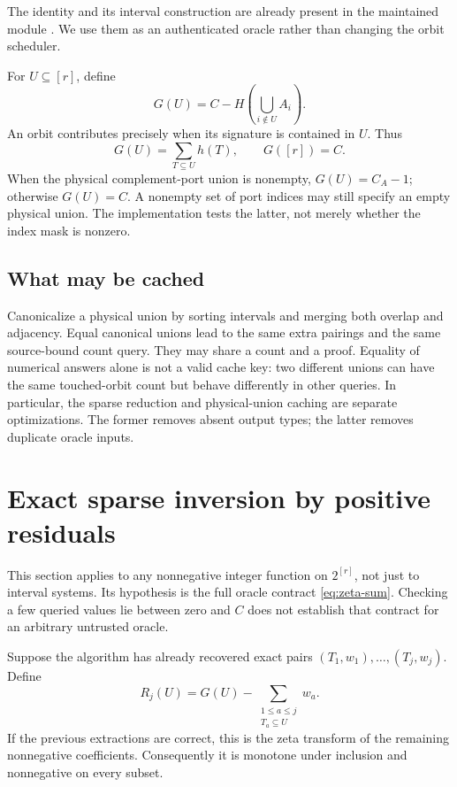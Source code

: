 \documentclass[11pt]{article}
\theoremstyle{definition}
\begin{document}
The identity and its interval construction are already present in the
maintained module \cite{repo-incidence}. We use them as an authenticated
oracle rather than changing the orbit scheduler.

For $U\subseteq[r]$, define
\begin{equation}
 G(U)=C-H\left(\bigcup_{i\notin U}A_i\right).
 \label{eq:zeta}
\end{equation}
An orbit contributes precisely when its signature is contained in $U$.
Thus
\begin{equation}
 G(U)=\sum_{T\subseteq U}h(T),\qquad G([r])=C.
 \label{eq:zeta-sum}
\end{equation}
When the physical complement-port union is nonempty,
$G(U)=C_A-1$; otherwise $G(U)=C$. A nonempty set of port indices may still
specify an empty physical union. The implementation tests the latter,
not merely whether the index mask is nonzero.

\subsection{What may be cached}
Canonicalize a physical union by sorting intervals and merging both overlap
and adjacency. Equal canonical unions lead to the same extra pairings and
the same source-bound count query. They may share a count and a proof.
Equality of numerical answers alone is not a valid cache key: two different
unions can have the same touched-orbit count but behave differently in other
queries. In particular, the sparse reduction and physical-union caching
are separate optimizations. The former removes absent output types; the
latter removes duplicate oracle inputs.

\section{Exact sparse inversion by positive residuals}
\label{sec:peeling}
This section applies to any nonnegative integer function on $2^{[r]}$,
not just to interval systems. Its hypothesis is the full oracle contract
\eqref{eq:zeta-sum}. Checking a few queried values lie between zero and $C$
does not establish that contract for an arbitrary untrusted oracle.

Suppose the algorithm has already recovered exact pairs
$(T_1,w_1),\ldots,(T_j,w_j)$. Define
\begin{equation}
 R_j(U)=G(U)-\sum_{\substack{1\leq a\leq j\\T_a\subseteq U}}w_a.
 \label{eq:residual}
\end{equation}
If the previous extractions are correct, this is the zeta transform of the
remaining nonnegative coefficients. Consequently it is monotone under
inclusion and nonnegative on every subset.
\end{document}
